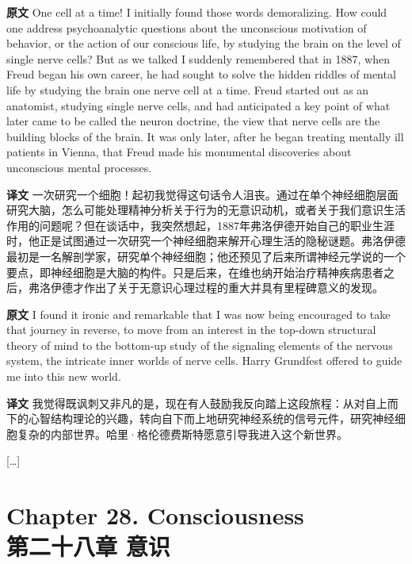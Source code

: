 \documentclass[UTF8]{ctexart}
\newenvironment{english}{\par\small\noindent\textbf{原文}\quad\ignorespaces}{\par}
\newenvironment{zhtranslation}{\par\noindent\textbf{译文}\quad\ignorespaces}{\par\vspace{0.35em}}
\begin{document}
\begin{english}
One cell at a time! I initially found those words demoralizing. How could one address psychoanalytic questions about the unconscious motivation of behavior, or the action of our conscious life, by studying the brain on the level of single nerve cells? But as we talked I suddenly remembered that in 1887, when Freud began his own career, he had sought to solve the hidden riddles of mental life by studying the brain one nerve cell at a time. Freud started out as an anatomist, studying single nerve cells, and had anticipated a key point of what later came to be called the neuron doctrine, the view that nerve cells are the building blocks of the brain. It was only later, after he began treating mentally ill patients in Vienna, that Freud made his monumental discoveries about unconscious mental processes.
\end{english}
\begin{zhtranslation}
一次研究一个细胞！起初我觉得这句话令人沮丧。通过在单个神经细胞层面研究大脑，怎么可能处理精神分析关于行为的无意识动机，或者关于我们意识生活作用的问题呢？但在谈话中，我突然想起，1887年弗洛伊德开始自己的职业生涯时，他正是试图通过一次研究一个神经细胞来解开心理生活的隐秘谜题。弗洛伊德最初是一名解剖学家，研究单个神经细胞；他还预见了后来所谓神经元学说的一个要点，即神经细胞是大脑的构件。只是后来，在维也纳开始治疗精神疾病患者之后，弗洛伊德才作出了关于无意识心理过程的重大并具有里程碑意义的发现。\end{zhtranslation}

\begin{english}
I found it ironic and remarkable that I was now being encouraged to take that journey in reverse, to move from an interest in the top-down structural theory of mind to the bottom-up study of the signaling elements of the nervous system, the intricate inner worlds of nerve cells. Harry Grundfest offered to guide me into this new world.
\end{english}
\begin{zhtranslation}
我觉得既讽刺又非凡的是，现在有人鼓励我反向踏上这段旅程：从对自上而下的心智结构理论的兴趣，转向自下而上地研究神经系统的信号元件，研究神经细胞复杂的内部世界。哈里·格伦德费斯特愿意引导我进入这个新世界。\end{zhtranslation}

\begin{center}
[\dots]
\end{center}

\section*{Chapter 28. Consciousness\\第二十八章 意识}
\end{document}

